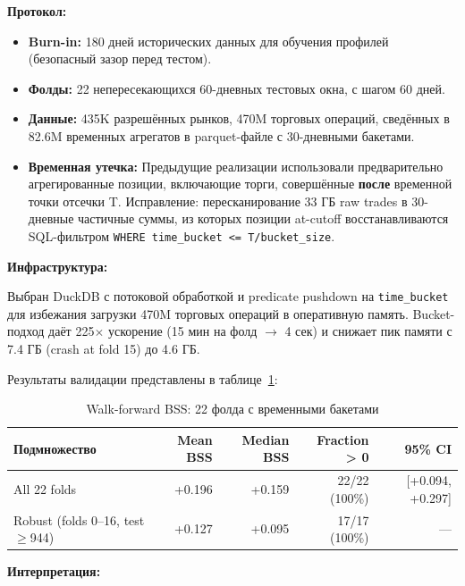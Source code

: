 \textbf{Протокол:}
\begin{itemize}
    \item \textbf{Burn-in:} 180 дней исторических данных для обучения профилей (безопасный зазор перед тестом).
    \item \textbf{Фолды:} 22 непересекающихся 60-дневных тестовых окна, с шагом 60 дней.
    \item \textbf{Данные:} 435K разрешённых рынков, 470M торговых операций, сведённых в 82.6M временных агрегатов в parquet-файле с 30-дневными бакетами.
    \item \textbf{Временная утечка:} Предыдущие реализации использовали предварительно агрегированные позиции, включающие торги, совершённые \textbf{после} временной точки отсечки T. Исправление: пересканирование 33 ГБ raw trades в 30-дневные частичные суммы, из которых позиции at-cutoff восстанавливаются SQL-фильтром \texttt{WHERE time\_bucket <= T/bucket\_size}.
\end{itemize}

\textbf{Инфраструктура:}

Выбран DuckDB с потоковой обработкой и predicate pushdown на \texttt{time\_bucket} для избежания загрузки 470M торговых операций в оперативную память. Bucket-подход даёт 225$\times$ ускорение (15 мин на фолд $\to$ 4 сек) и снижает пик памяти с 7.4 ГБ (crash at fold 15) до 4.6 ГБ.

Результаты валидации представлены в таблице~\ref{tab:walkforward_bss}:

\begin{table}[h!]
\centering
\caption{Walk-forward BSS: 22 фолда с временными бакетами}
\label{tab:walkforward_bss}
\begin{tabular}{lrrrr}
\toprule
\textbf{Подмножество} & \textbf{Mean BSS} & \textbf{Median BSS} & \textbf{Fraction > 0} & \textbf{95\% CI} \\
\midrule
All 22 folds & +0.196 & +0.159 & 22/22 (100\%) & [+0.094, +0.297] \\
Robust (folds 0--16, test $\geq$944) & +0.127 & +0.095 & 17/17 (100\%) & — \\
\bottomrule
\end{tabular}
\end{table}

\textbf{Интерпретация:}

